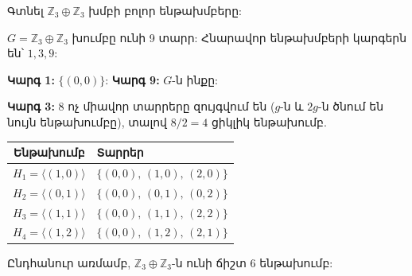 \documentclass[12pt,a4paper]{article}
\newcommand{\armtext}{} %
\newenvironment{problem}{\begin{mdframed}[style=problemstyle]\armtext}{\end{mdframed}}
\newenvironment{sol}{\begin{mdframed}[style=solstyle]\armtext}{\end{mdframed}}
\newcommand{\Z}{\mathbb{Z}}
\newcommand{\gen}[1]{\langle #1 \rangle}
\begin{document}
\begin{problem}
Գտնել $\Z_3 \oplus \Z_3$ խմբի բոլոր ենթախմբերը:
\end{problem}

\begin{sol}
$G = \Z_3 \oplus \Z_3$ խումբը ունի 9 տարր: Հնարավոր ենթախմբերի կարգերն են՝ $1, 3, 9$:

\medskip
\textbf{\color{SectCol}Կարգ 1:} $\{(0,0)\}$:
\qquad\textbf{\color{SectCol}Կարգ 9:} $G$-ն ինքը:

\medskip
\textbf{\color{SectCol}Կարգ 3:}
8 ոչ միավոր տարրերը զույգվում են ($g$-ն և $2g$-ն ծնում են նույն ենթախումբը),
տալով $8/2 = 4$ ցիկլիկ ենթախումբ.

\smallskip
\begin{center}
\renewcommand{\arraystretch}{1.15}
\begin{tabular}{cl}
  \toprule
  \armtext{Ենթախումբ} & \armtext{Տարրեր} \\
  \midrule
  $H_1 = \gen{(1,0)}$ & $\{(0,0),\,(1,0),\,(2,0)\}$ \\
  $H_2 = \gen{(0,1)}$ & $\{(0,0),\,(0,1),\,(0,2)\}$ \\
  $H_3 = \gen{(1,1)}$ & $\{(0,0),\,(1,1),\,(2,2)\}$ \\
  $H_4 = \gen{(1,2)}$ & $\{(0,0),\,(1,2),\,(2,1)\}$ \\
  \bottomrule
\end{tabular}
\end{center}

\medskip
Ընդհանուր առմամբ, $\Z_3 \oplus \Z_3$-ն ունի ճիշտ $\boxed{6}$ ենթախումբ:
\end{sol}
\end{document}
